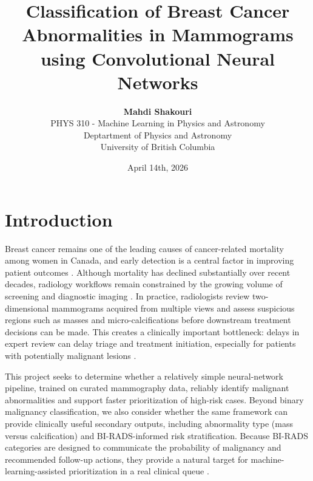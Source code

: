 \documentclass[12pt]{article}
\title{Classification of Breast Cancer Abnormalities in Mammograms using Convolutional Neural Networks}
\author{
    \textbf{Mahdi Shakouri} \\[0.6em]
    PHYS 310 - Machine Learning in Physics and Astronomy \\[0.4em]
    Deptartment of Physics and Astronomy \\[0.1em]
    University of British Columbia \\[0.6em]
}
\date{April 14th, 2026}
\begin{document}
\maketitle




\vspace{.16\textwidth}


\setcounter{tocdepth}{3}
\tableofcontents
\clearpage


\section{Introduction}

Breast cancer remains one of the leading causes of cancer-related mortality among women in Canada, and early detection is a central factor in improving patient outcomes \cite{ref:example5}. Although mortality has declined substantially over recent decades, radiology workflows remain constrained by the growing volume of screening and diagnostic imaging \cite{ref:example5}. In practice, radiologists review two-dimensional mammograms acquired from multiple views and assess suspicious regions such as masses and micro-calcifications before downstream treatment decisions can be made. This creates a clinically important bottleneck: delays in expert review can delay triage and treatment initiation, especially for patients with potentially malignant lesions \cite{ref:bleicher2016}.

\medskip \noindent
This project seeks to determine whether a relatively simple neural-network pipeline, trained on curated mammography data, reliably identify malignant abnormalities and support faster prioritization of high-risk cases. Beyond binary malignancy classification, we also consider whether the same framework can provide clinically useful secondary outputs, including abnormality type (mass versus calcification) and BI-RADS-informed risk stratification. Because BI-RADS categories are designed to communicate the probability of malignancy and recommended follow-up actions, they provide a natural target for machine-learning-assisted prioritization in a real clinical queue \cite{ref:example4}.
\end{document}
